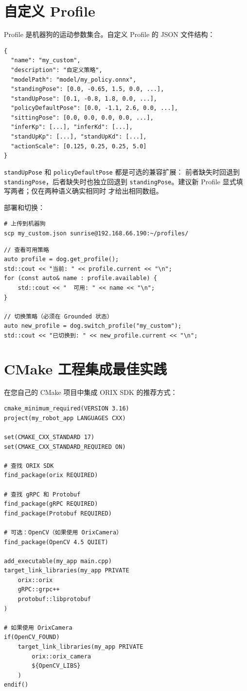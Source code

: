 \documentclass[a4paper,11pt,openany]{book}
\begin{document}
\section{自定义 Profile}

Profile 是机器狗的运动参数集合。自定义 Profile 的 JSON 文件结构：

\begin{lstlisting}[style=plain]
{
  "name": "my_custom",
  "description": "自定义策略",
  "modelPath": "model/my_policy.onnx",
  "standingPose": [0.0, -0.65, 1.5, 0.0, ...],
  "standUpPose": [0.1, -0.8, 1.8, 0.0, ...],
  "policyDefaultPose": [0.0, -1.1, 2.6, 0.0, ...],
  "sittingPose": [0.0, 0.0, 0.0, 0.0, ...],
  "inferKp": [...], "inferKd": [...],
  "standUpKp": [...], "standUpKd": [...],
  "actionScale": [0.125, 0.25, 0.25, 5.0]
}
\end{lstlisting}

\texttt{standUpPose} 和 \texttt{policyDefaultPose} 都是可选的兼容扩展：
前者缺失时回退到 \texttt{standingPose}，后者缺失时也独立回退到
\texttt{standingPose}。建议新 Profile 显式填写两者；仅在两种语义确实相同时
才给出相同数组。

部署和切换：

\begin{lstlisting}[style=bash]
# 上传到机器狗
scp my_custom.json sunrise@192.168.66.190:~/profiles/
\end{lstlisting}

\begin{lstlisting}[style=cpp]
// 查看可用策略
auto profile = dog.get_profile();
std::cout << "当前: " << profile.current << "\n";
for (const auto& name : profile.available) {
    std::cout << "  可用: " << name << "\n";
}

// 切换策略（必须在 Grounded 状态）
auto new_profile = dog.switch_profile("my_custom");
std::cout << "已切换到: " << new_profile.current << "\n";
\end{lstlisting}

\section{CMake 工程集成最佳实践}

在您自己的 CMake 项目中集成 ORIX SDK 的推荐方式：

\begin{lstlisting}[style=cmake]
cmake_minimum_required(VERSION 3.16)
project(my_robot_app LANGUAGES CXX)

set(CMAKE_CXX_STANDARD 17)
set(CMAKE_CXX_STANDARD_REQUIRED ON)

# 查找 ORIX SDK
find_package(orix REQUIRED)

# 查找 gRPC 和 Protobuf
find_package(gRPC REQUIRED)
find_package(Protobuf REQUIRED)

# 可选：OpenCV（如果使用 OrixCamera）
find_package(OpenCV 4.5 QUIET)

add_executable(my_app main.cpp)
target_link_libraries(my_app PRIVATE
    orix::orix
    gRPC::grpc++
    protobuf::libprotobuf
)

# 如果使用 OrixCamera
if(OpenCV_FOUND)
    target_link_libraries(my_app PRIVATE
        orix::orix_camera
        ${OpenCV_LIBS}
    )
endif()
\end{lstlisting}
\end{document}
